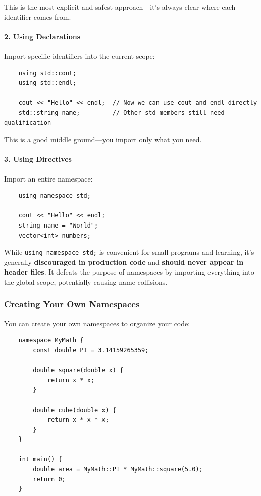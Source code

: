 This is the most explicit and safest approach—it's always clear where each identifier comes from.

\paragraph{2. Using Declarations}

Import specific identifiers into the current scope:

\begin{lstlisting}
	using std::cout;
	using std::endl;
	
	cout << "Hello" << endl;  // Now we can use cout and endl directly
	std::string name;         // Other std members still need qualification
\end{lstlisting}

This is a good middle ground—you import only what you need.

\paragraph{3. Using Directives}

Import an entire namespace:

\begin{lstlisting}
	using namespace std;
	
	cout << "Hello" << endl;
	string name = "World";
	vector<int> numbers;
\end{lstlisting}

\begin{remark}
	While \texttt{using namespace std;} is convenient for small programs and learning, it's generally \textbf{discouraged in production code} and \textbf{should never appear in header files}. It defeats the purpose of namespaces by importing everything into the global scope, potentially causing name collisions.
\end{remark}

\subsubsection{Creating Your Own Namespaces}

You can create your own namespaces to organize your code:

\begin{lstlisting}
	namespace MyMath {
		const double PI = 3.14159265359;
		
		double square(double x) {
			return x * x;
		}
		
		double cube(double x) {
			return x * x * x;
		}
	}
	
	int main() {
		double area = MyMath::PI * MyMath::square(5.0);
		return 0;
	}
\end{lstlisting}

